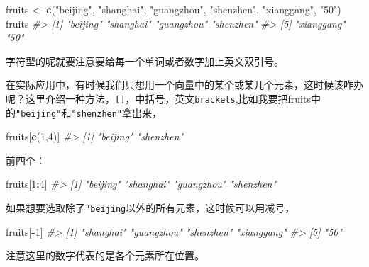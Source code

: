 \documentclass[
]{book}
\newenvironment{Shaded}{\begin{snugshade}}{\end{snugshade}}
\newcommand{\CommentTok}[1]{\textcolor[rgb]{0.56,0.35,0.01}{\textit{#1}}}
\newcommand{\DecValTok}[1]{\textcolor[rgb]{0.00,0.00,0.81}{#1}}
\newcommand{\FunctionTok}[1]{\textcolor[rgb]{0.13,0.29,0.53}{\textbf{#1}}}
\newcommand{\NormalTok}[1]{#1}
\newcommand{\OtherTok}[1]{\textcolor[rgb]{0.56,0.35,0.01}{#1}}
\newcommand{\SpecialCharTok}[1]{\textcolor[rgb]{0.81,0.36,0.00}{\textbf{#1}}}
\newcommand{\StringTok}[1]{\textcolor[rgb]{0.31,0.60,0.02}{#1}}
\begin{document}
\begin{Shaded}
\begin{Highlighting}[]
\NormalTok{fruits }\OtherTok{\textless{}{-}} \FunctionTok{c}\NormalTok{(}\StringTok{"beijing"}\NormalTok{, }\StringTok{"shanghai"}\NormalTok{, }\StringTok{"guangzhou"}\NormalTok{, }\StringTok{"shenzhen"}\NormalTok{, }\StringTok{"xianggang"}\NormalTok{, }\StringTok{"50"}\NormalTok{)}
\NormalTok{fruits}
\CommentTok{\#\textgreater{} [1] "beijing"   "shanghai"  "guangzhou" "shenzhen" }
\CommentTok{\#\textgreater{} [5] "xianggang" "50"}
\end{Highlighting}
\end{Shaded}

字符型的呢就要注意要给每一个单词或者数字加上英文双引号。

在实际应用中，有时候我们只想用一个向量中的某个或某几个元素，这时候该咋办呢？这里介绍一种方法，\texttt{{[}{]}}，中括号，英文\texttt{brackets},比如我要把fruits中的\texttt{"beijing"}和\texttt{"shenzhen"}拿出来，

\begin{Shaded}
\begin{Highlighting}[]
\NormalTok{fruits[}\FunctionTok{c}\NormalTok{(}\DecValTok{1}\NormalTok{,}\DecValTok{4}\NormalTok{)]}
\CommentTok{\#\textgreater{} [1] "beijing"  "shenzhen"}
\end{Highlighting}
\end{Shaded}

前四个：

\begin{Shaded}
\begin{Highlighting}[]
\NormalTok{fruits[}\DecValTok{1}\SpecialCharTok{:}\DecValTok{4}\NormalTok{]}
\CommentTok{\#\textgreater{} [1] "beijing"   "shanghai"  "guangzhou" "shenzhen"}
\end{Highlighting}
\end{Shaded}

如果想要选取除了\texttt{"beijing}以外的所有元素，这时候可以用减号，

\begin{Shaded}
\begin{Highlighting}[]
\NormalTok{fruits[}\SpecialCharTok{{-}}\DecValTok{1}\NormalTok{]}
\CommentTok{\#\textgreater{} [1] "shanghai"  "guangzhou" "shenzhen"  "xianggang"}
\CommentTok{\#\textgreater{} [5] "50"}
\end{Highlighting}
\end{Shaded}

注意这里的数字代表的是各个元素所在位置。
\end{document}
